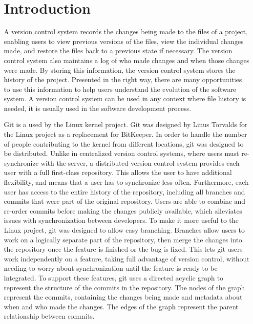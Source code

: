 \chapter{Introduction}

A version control system records the changes being made to the files of
a project,
enabling users to view previous versions of the files,
view the individual changes made,
and restore the files back to a previous state if necessary.
The version control system also maintains a log of who made changes and
when those changes were made.
By storing this information, the version control system stores the
history of the project.
Presented in the right way, there are many opportunities to use
this information to help users understand the evolution of the software
system.
A version control system can be used in any context where file history
is needed, it is usually used in the software development process.

Git is a  used by the Linux kernel
project.
Git was designed by Linus Torvalds for the Linux project as a
replacement for BitKeeper.
In order to handle the number of people
contributing to the kernel from different locations, git was designed to
be distributed.
Unlike in centralized version control systems, where users must
re-synchronize with the server, a distributed version control system
provides each user with a full first-class repository. This allows the
user to have additional flexibility, and means that a user has to
synchronize less often.
Furthermore, each user has access to the entire history of the
repository, including all branches and commits that were part of the
original repository.
Users are able to combine and re-order commits before making the changes
publicly available, which alleviates issues with synchronization between
developers.
To make it more useful to the Linux project,
git was designed to allow easy branching.
Branches allow users to work on a logically separate part of the
repository, then merge the changes into the repository once the feature
is finished or the bug is fixed.
This lets git users work independently on a feature, taking full
advantage of version control, without needing to worry about
synchronization until the feature is ready to be integrated.
To support these features, git uses a directed acyclic graph to
represent the structure of the commits in the repository.
The nodes of the graph represent the commits, containing the changes
being made and metadata about when and who made the changes.
The edges of the graph represent the parent relationship between
commits.

